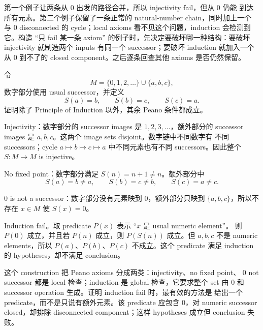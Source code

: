 \begin{explanation}
第一个例子让两条从 \(0\) 出发的路径合并，所以 injectivity fail，但从 \(0\) 仍能
到达所有元素。第二个例子保留了一条正常的 natural-number chain，同时加上一个
与 \(0\) disconnected 的 cycle；local axioms 看不见这个问题，induction 会检测到
它。构造 ``只 fail 某一条 axiom'' 的例子时，先决定要破坏哪一种结构：要破坏
injectivity 就制造两个 inputs 有同一个 successor；要破坏 induction 就加入一个
从 \(0\) 到不了的 closed component。之后逐条回查其他 axioms 是否仍然保留。
\end{explanation}

\begin{exerciseblock}
令
\[
M=\{0,1,2,\ldots\}\cup\{a,b,c\},
\]
数字部分使用 usual successor，并定义
\[
S(a)=b,\qquad S(b)=c,\qquad S(c)=a.
\]
证明除了 Principle of Induction 以外，其余 Peano 条件都成立。
\end{exerciseblock}

\begin{solution}
Injectivity：数字部分的 successor images 是 \(1,2,3,\ldots\)，额外部分的
successor images 是 \(a,b,c\)。这两个 image sets disjoint。数字链中不同数字有
不同 successors；cycle \(a\mapsto b\mapsto c\mapsto a\) 中不同元素也有不同
successors。因此整个 \(S:M\to M\) is injective。

No fixed point：数字部分满足 \(S(n)=n+1\neq n\)。额外部分中
\[
S(a)=b\neq a,\qquad S(b)=c\neq b,\qquad S(c)=a\neq c.
\]

\(0\) is not a successor：数字部分没有元素映到 \(0\)，额外部分只映到
\(\{a,b,c\}\)，所以不存在 \(x\in M\) 使 \(S(x)=0\)。

Induction fail。取 predicate \(P(x)\) 表示 ``\(x\) 是 usual numeric element''。
则 \(P(0)\) 成立，并且若 \(P(n)\) 成立，则 \(P(S(n))\) 成立。但 \(a,b,c\) 不是
numeric elements，所以 \(P(a)\)、\(P(b)\)、\(P(c)\) 不成立。这个 predicate
满足 induction 的 hypotheses，却不满足 conclusion。
\end{solution}

\begin{explanation}
这个 construction 把 Peano axioms 分成两类：injectivity、no fixed point、
\(0\) not successor 都是 local 检查；induction 是 global 检查，它要求整个 set
由 \(0\) 和 successor operation 生成。证明 induction fail 时，最有效的方法是
给出一个 predicate，而不是只说有额外元素。该 predicate 应包含 \(0\)，对 numeric
successor closed，却排除 disconnected component；这样 hypotheses 成立但
conclusion 失败。
\end{explanation}

